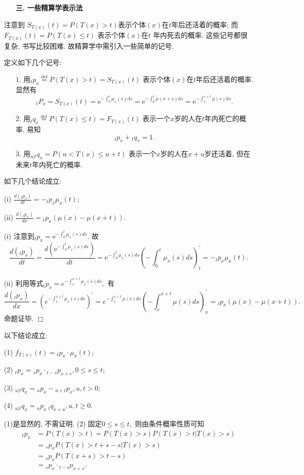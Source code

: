 \documentclass[a4paper,10pt]{ctexbook}
\newcommand{\hei}{\CJKfamily{hei}}      %
\def\qed{\hfill$\Box$\medskip}
\begin{document}
\begin{itemize}
    \item[{\bf\hei 三.}]{\bf\hei 一些精算学表示法}
\end{itemize}
注意到 $ S_{T(x)}(t)=P(T(x)>t)$表示个体$ (x)$在$t$年后还活着的概率; 而$F_{T(x)}(t)=P(T(x)\le t)$ 表示个体$(x)$在$t$ 年内死去的概率. 这些记号都很复杂, 书写比较困难. 故精算学中需引入一些简单的记号.


定义如下几个记号:
\begin{enumerate}
    \item[$\mathring 1.$] 用$_tp_{x}\stackrel{\text{def}}{=}P(T(x)>t)=S_{T(x)}(t)$
        表示个体$(x)$在$t$年后还活着的概率. 显然有
        $$ {}_tP_x=S_{T(x)}(t)=\mathrm{e}^{-\int_{0}^{t}\mu_x(s)\mathrm{d}s}=\mathrm{e}^{-\int_{0}^{t}\mu(x+s)\mathrm{d}s}=\mathrm{e}^{-\int_{x}^{x+t}\mu(s)\mathrm{d}s}.$$
    \item[$\mathring 2.$] 用$_tq_{x}\stackrel{\text{def}}{=}P(T(x)\leq t)=F_{T(x)}(t)$
        表示一个$x$岁的人在$t$年内死亡的概率. 易知
        $$_tp_{x}+{}_tq_{x}=1.$$
    \item[$\mathring 3.$] 用$ _{u|t}q_x=P(u<T(x)\leq u+t)$
        表示一个$x$岁的人在$x+u$岁还活着, 但在未来$t$年内死亡的概率.
\end{enumerate}
\begin{proposition}如下几个结论成立:

    (i) $\frac{d(_tp_x)}{dt}=-_tp_x\mu_x(t);$

    (ii) $\frac{d(_tp_x)}{dx}= {}_tp_x(\mu(x)-\mu(x+t)).$


\end{proposition}

\proof (i) 注意到${}_tp_x=\mathrm{e}^{-\int_{0}^{t}\mu_x(s)ds}.$ 故
$$\frac{d(_tp_x)}{dt}=\frac{d(\mathrm{e}^{-\int_{0}^{t}\mu_x(s)ds})}{dt}=\mathrm{e}^{-\int_{0}^{t}\mu_x(s)ds}({-\int_{0}^{t}\mu_x(s)ds})^{\prime}_t=-_tp_x\mu_x(t).$$

(ii) 利用等式${}_tp_x=e^{-\int_{x}^{x+t}\mu_x(s)ds},$ 有
$$\frac{d(_tp_x)}{dx}=(e^{-\int_{x}^{x+t}\mu_x(s)ds})^{\prime}=e^{-\int_{x}^{x+t}\mu(s)ds}({-\int_{x}^{x+t}\mu(s)ds})^{\prime}_x= {}_tp_x(\mu(x)-\mu(x+t)).$$
命题证毕.
\qed

\begin{proposition}以下结论成立:

    (1) $f_{T(x)}(t)={}_tp_x\cdot \mu_x(t);$

    (2) $_tp_x={}_sp_x\cdot{}_{t-s}p_{x+s},0\leq s\leq t;$

    (3) ${}_{u|t}q_x={}_up_x-{}_{u+t}p_x, u,t>0;$

    (4) ${}_{u|t}q_x={}_up_x~{}_{t}q_{x+u},u,t\ge0.$
\end{proposition}
\proof (1)是显然的, 不需证明. (2)
固定$0\le s\le t,$ 则由条件概率性质可知
\begin{align*}
    {}_tp_x & =P(T(x)>t)=P(T(x)>s)P(T(x)>t|T(x)>s) \\
            & ={}_sp_xP(T(x)>t+s-s|T(x)>s)         \\
            & ={}_sp_xP(T(x+s)>t-s)                \\
            & ={}_sp_x\cdot{}_{t-s}p_{x+s}.\end{align*}
\end{document}
